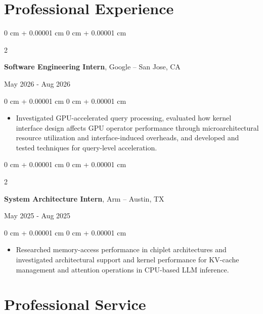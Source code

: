 \documentclass[10pt, letterpaper]{article}
\newenvironment{highlights}{
    \begin{itemize}[
        topsep=0.10 cm,
        parsep=0.10 cm,
        partopsep=0pt,
        itemsep=0pt,
        leftmargin=0 cm + 10pt
    ]
}{
    \end{itemize}
} %
\newenvironment{onecolentry}{
    \begin{adjustwidth}{
        0 cm + 0.00001 cm
    }{
        0 cm + 0.00001 cm
    }
}{
    \end{adjustwidth}
} %
\newenvironment{twocolentry}[2][]{
    \onecolentry
    \def\secondColumn{#2}
    \setcolumnwidth{\fill, 4.5 cm}
    \begin{paracol}{2}
}{
    \switchcolumn \raggedleft \secondColumn
    \end{paracol}
    \endonecolentry
} %
\begin{document}
    \section{Professional Experience}
    
        \begin{twocolentry}{
        May 2026 - Aug 2026
        }
        \textbf{Software Engineering Intern}, Google -- San Jose, CA
        \end{twocolentry}
        
        \vspace{0.10 cm}

        \begin{onecolentry}
        \begin{highlights}
        \item Investigated GPU-accelerated query processing, evaluated how kernel interface design affects GPU operator performance through microarchitectural resource utilization and interface-induced overheads, and developed and tested techniques for query-level acceleration.
        \end{highlights}
        \end{onecolentry}
        
        \vspace{0.2 cm}
        
        \begin{twocolentry}{
        May 2025 - Aug 2025
        }
        \textbf{System Architecture Intern}, Arm -- Austin, TX
        \end{twocolentry}
        
        \vspace{0.10 cm}
        
        \begin{onecolentry}
        \begin{highlights}
        \item Researched memory-access performance in chiplet architectures and investigated architectural support and kernel performance for KV-cache management and attention operations in CPU-based LLM inference.
        \end{highlights}
        \end{onecolentry}
        
        \vspace{0.2 cm}




    \section{Professional Service}
\end{document}
